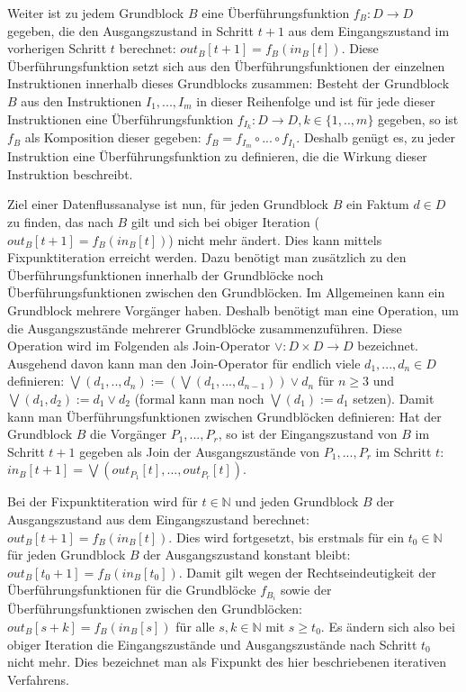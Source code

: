 Weiter ist zu jedem Grundblock $B$ eine Überführungsfunktion $f_B:D\to D$ gegeben, die den Ausgangszustand in Schritt $t+1$ aus dem Eingangszustand im vorherigen Schritt $t$ berechnet: $out_B[t+1]=f_B(in_B[t])$.
Diese Überführungsfunktion setzt sich aus den Überführungsfunktionen der einzelnen Instruktionen innerhalb dieses Grundblocks zusammen:
Besteht der Grundblock $B$ aus den Instruktionen $I_1,...,I_m$ in dieser Reihenfolge und ist für jede dieser Instruktionen eine Überführungsfunktion $f_{I_k}:D\to D, k\in \{1,..,m\}$ gegeben, so ist $f_B$ als Komposition dieser gegeben: $f_B=f_{I_m}\circ ... \circ f_{I_1}$.
Deshalb genügt es, zu jeder Instruktion eine Überführungsfunktion zu definieren, die die Wirkung dieser Instruktion beschreibt.

Ziel einer Datenflussanalyse ist nun, für jeden Grundblock $B$ ein Faktum $d\in D$ zu finden, das nach $B$ gilt und sich bei obiger Iteration ($out_B[t+1]=f_B(in_B[t])$) nicht mehr ändert.
Dies kann mittels Fixpunktiteration erreicht werden.
Dazu benötigt man zusätzlich zu den Überführungsfunktionen innerhalb der Grundblöcke noch Überführungsfunktionen zwischen den Grundblöcken.
Im Allgemeinen kann ein Grundblock mehrere Vorgänger haben.
Deshalb benötigt man eine Operation, um die Ausgangszustände mehrerer Grundblöcke zusammenzuführen.
Diese Operation wird im Folgenden als Join-Operator $\vee :D\times D \to D$ bezeichnet.
Ausgehend davon kann man den Join-Operator für endlich viele $d_1,...,d_n \in D$ definieren: $\bigvee (d_1,..,d_n):=(\bigvee(d_1,...,d_{n-1})) \vee d_n$ für $n \geq 3$ und $\bigvee(d_1,d_2):=d_1 \vee d_2$ (formal kann man noch $\bigvee (d_1):=d_1$ setzen).
Damit kann man Überführungsfunktionen zwischen Grundblöcken definieren: 
Hat der Grundblock $B$ die Vorgänger $P_1,...,P_r$, so ist der Eingangszustand von $B$ im Schritt $t+1$ gegeben als Join der Ausgangszustände von $P_1,...,P_r$ im Schritt $t$: $in_B[t+1]=\bigvee(out_{P_1}[t],...,out_{P_r}[t])$.

Bei der Fixpunktiteration wird für $t \in \mathbb{N}$ und jeden Grundblock $B$ der Ausgangszustand aus dem Eingangszustand berechnet: $out_B[t+1]=f_B(in_B[t])$. 
Dies wird fortgesetzt, bis erstmals für ein $t_0 \in \mathbb{N}$ für jeden Grundblock $B$ der Ausgangszustand konstant bleibt: $out_B[t_0+1]=f_B(in_B[t_0])$.
Damit gilt wegen der Rechtseindeutigkeit der Überführungsfunktionen für die Grundblöcke $f_{B_i}$ sowie der Überführungsfunktionen zwischen den Grundblöcken: $out_B[s+k]=f_B(in_B[s])$ für alle $s,k \in \mathbb{N}$ mit $s \geq t_0$.
Es ändern sich also bei obiger Iteration die Eingangszustände und Ausgangszustände nach Schritt $t_0$ nicht mehr.
Dies bezeichnet man als Fixpunkt des hier beschriebenen iterativen Verfahrens.

